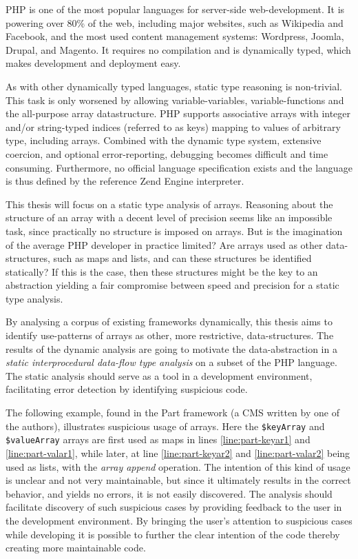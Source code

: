 PHP is one of the most popular languages for server-side web-development. It is powering over 80\% of the web, including major websites, such as Wikipedia and Facebook, and the most used content management systems: Wordpress, Joomla, Drupal, and Magento. It requires no compilation and is dynamically typed, which makes development and deployment easy. 

As with other dynamically typed languages, static type reasoning is non-trivial. This task is only worsened by allowing variable-variables, variable-functions and the all-purpose array datastructure. PHP supports associative arrays with integer and/or string-typed indices (referred to as keys) mapping to values of arbitrary type, including arrays. Combined with the dynamic type system, extensive coercion, and optional error-reporting, debugging becomes difficult and time consuming. Furthermore, no official language specification exists and the language is thus defined by the reference Zend Engine interpreter.


This thesis will focus on a static type analysis of arrays. Reasoning about the structure of an array with a decent level of precision seems like an impossible task, since practically no structure is imposed on arrays. But is the imagination of the average PHP developer in practice limited? Are arrays used as other data-structures, such as maps and lists, and can these structures be identified statically? If this is the case, then these structures might be the key to an abstraction yielding a fair compromise between speed and precision for a static type analysis. 

By analysing a corpus of existing frameworks dynamically, this thesis aims to identify use-patterns of arrays as other, more restrictive, data-structures. The results of the dynamic analysis are going to motivate the data-abstraction in a \emph{static interprocedural data-flow type analysis} on a subset of the PHP language. The static analysis should serve as a tool in a development environment, facilitating error detection by identifying suspicious code. 


The following example, found in the Part framework (a CMS written by one of the authors), illustrates suspicious usage of arrays. Here the \texttt{\$keyArray} and \texttt{\$valueArray} arrays are first used as maps in lines \ref{line:part-keyar1} and \ref{line:part-valar1}, while later, at line \ref{line:part-keyar2} and \ref{line:part-valar2} being used as lists, with the \emph{array append} operation. The intention of this kind of usage is unclear and not very maintainable, but since it ultimately results in the correct behavior, and yields no errors, it is not easily discovered. The analysis should facilitate discovery of such suspicious cases by providing feedback to the user in the development environment. By bringing the user's attention to suspicious cases while developing it is possible to further the clear intention of the code thereby creating more maintainable code.

